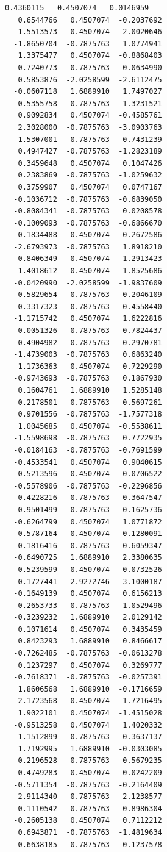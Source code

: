 \documentclass[11pt]{article}
\begin{document}
\begin{Verbatim}[commandchars=\\\{\}]
   0.4360115   0.4507074   0.0146959
   0.6544766   0.4507074  -0.2037692
  -1.5513573   0.4507074   2.0020646
  -1.8650704  -0.7875763   1.0774941
   1.3375477   0.4507074  -0.8868403
  -0.7240773  -0.7875763  -0.0634990
   0.5853876  -2.0258599  -2.6112475
  -0.0607118   1.6889910   1.7497027
   0.5355758  -0.7875763  -1.3231521
   0.9092834   0.4507074  -0.4585761
   2.3028000  -0.7875763  -3.0903763
  -1.5307001  -0.7875763   0.7431239
   0.4947427  -0.7875763  -1.2823189
   0.3459648   0.4507074   0.1047426
   0.2383869  -0.7875763  -1.0259632
   0.3759907   0.4507074   0.0747167
  -0.1036712  -0.7875763  -0.6839050
  -0.8084341  -0.7875763   0.0208578
  -0.1009093  -0.7875763  -0.6866670
   0.1834488   0.4507074   0.2672586
  -2.6793973  -0.7875763   1.8918210
  -0.8406349   0.4507074   1.2913423
  -1.4018612   0.4507074   1.8525686
  -0.0420990  -2.0258599  -1.9837609
  -0.5829654  -0.7875763  -0.2046109
  -0.3317323  -0.7875763  -0.4558440
  -1.1715742   0.4507074   1.6222816
  -0.0051326  -0.7875763  -0.7824437
  -0.4904982  -0.7875763  -0.2970781
  -1.4739003  -0.7875763   0.6863240
   1.1736363   0.4507074  -0.7229290
  -0.9743693  -0.7875763   0.1867930
   0.1604761   1.6889910   1.5285148
  -0.2178501  -0.7875763  -0.5697261
   0.9701556  -0.7875763  -1.7577318
   1.0045685   0.4507074  -0.5538611
  -1.5598698  -0.7875763   0.7722935
  -0.0184163  -0.7875763  -0.7691599
  -0.4533541   0.4507074   0.9040615
   0.5213596   0.4507074  -0.0706522
  -0.5578906  -0.7875763  -0.2296856
  -0.4228216  -0.7875763  -0.3647547
  -0.9501499  -0.7875763   0.1625736
  -0.6264799   0.4507074   1.0771872
   0.5787164   0.4507074  -0.1280091
  -0.1816416  -0.7875763  -0.6059347
  -0.6490725   1.6889910   2.3380635
   0.5239599   0.4507074  -0.0732526
  -0.1727441   2.9272746   3.1000187
  -0.1649139   0.4507074   0.6156213
   0.2653733  -0.7875763  -1.0529496
  -0.3239232   1.6889910   2.0129142
   0.1071614   0.4507074   0.3435459
   0.8423293   1.6889910   0.8466617
  -0.7262485  -0.7875763  -0.0613278
   0.1237297   0.4507074   0.3269777
  -0.7618371  -0.7875763  -0.0257391
   1.8606568   1.6889910  -0.1716659
   2.1723568   0.4507074  -1.7216495
   1.9022101   0.4507074  -1.4515028
  -0.9513258   0.4507074   1.4020332
  -1.1512899  -0.7875763   0.3637137
   1.7192995   1.6889910  -0.0303085
  -0.2196528  -0.7875763  -0.5679235
   0.4749283   0.4507074  -0.0242209
  -0.5711354  -0.7875763  -0.2164409
  -2.9114340  -0.7875763   2.1238577
   0.1110542  -0.7875763  -0.8986304
  -0.2605138   0.4507074   0.7112212
   0.6943871  -0.7875763  -1.4819634
  -0.6638185  -0.7875763  -0.1237578

\end{Verbatim}
\end{document}
